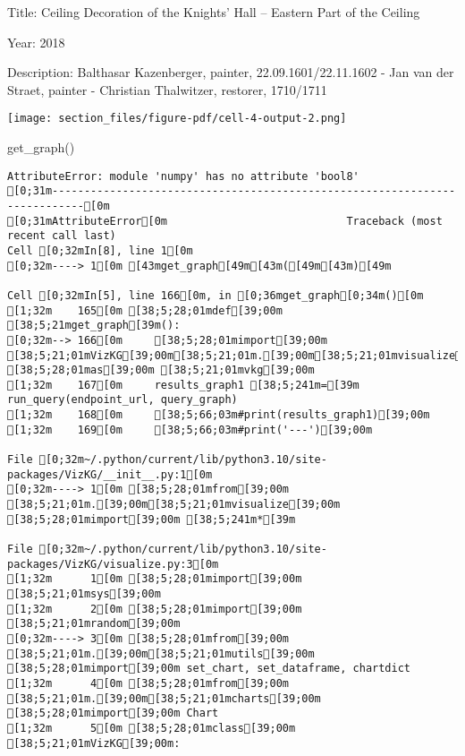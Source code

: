 \documentclass[
  letterpaper,
]{book}
\newenvironment{Shaded}{\begin{snugshade}}{\end{snugshade}}
\newcommand{\NormalTok}[1]{\textcolor[rgb]{0.00,0.23,0.31}{#1}}
\begin{document}
Title: Ceiling Decoration of the Knights' Hall -- Eastern Part of the
Ceiling

Year: 2018

Description: Balthasar Kazenberger, painter, 22.09.1601/22.11.1602 - Jan
van der Straet, painter - Christian Thalwitzer, restorer, 1710/1711

\texttt{[image: section\_files/figure-pdf/cell-4-output-2.png]}

\begin{Shaded}
\begin{Highlighting}[]
\NormalTok{get\_graph()}
\end{Highlighting}
\end{Shaded}

\begin{verbatim}
AttributeError: module 'numpy' has no attribute 'bool8'
[0;31m---------------------------------------------------------------------------[0m
[0;31mAttributeError[0m                            Traceback (most recent call last)
Cell [0;32mIn[8], line 1[0m
[0;32m----> 1[0m [43mget_graph[49m[43m([49m[43m)[49m

Cell [0;32mIn[5], line 166[0m, in [0;36mget_graph[0;34m()[0m
[1;32m    165[0m [38;5;28;01mdef[39;00m [38;5;21mget_graph[39m():
[0;32m--> 166[0m     [38;5;28;01mimport[39;00m [38;5;21;01mVizKG[39;00m[38;5;21;01m.[39;00m[38;5;21;01mvisualize[39;00m [38;5;28;01mas[39;00m [38;5;21;01mvkg[39;00m
[1;32m    167[0m     results_graph1 [38;5;241m=[39m run_query(endpoint_url, query_graph)
[1;32m    168[0m     [38;5;66;03m#print(results_graph1)[39;00m
[1;32m    169[0m     [38;5;66;03m#print('---')[39;00m

File [0;32m~/.python/current/lib/python3.10/site-packages/VizKG/__init__.py:1[0m
[0;32m----> 1[0m [38;5;28;01mfrom[39;00m [38;5;21;01m.[39;00m[38;5;21;01mvisualize[39;00m [38;5;28;01mimport[39;00m [38;5;241m*[39m

File [0;32m~/.python/current/lib/python3.10/site-packages/VizKG/visualize.py:3[0m
[1;32m      1[0m [38;5;28;01mimport[39;00m [38;5;21;01msys[39;00m
[1;32m      2[0m [38;5;28;01mimport[39;00m [38;5;21;01mrandom[39;00m
[0;32m----> 3[0m [38;5;28;01mfrom[39;00m [38;5;21;01m.[39;00m[38;5;21;01mutils[39;00m [38;5;28;01mimport[39;00m set_chart, set_dataframe, chartdict
[1;32m      4[0m [38;5;28;01mfrom[39;00m [38;5;21;01m.[39;00m[38;5;21;01mcharts[39;00m [38;5;28;01mimport[39;00m Chart
[1;32m      5[0m [38;5;28;01mclass[39;00m [38;5;21;01mVizKG[39;00m:


\end{verbatim}
\end{document}
